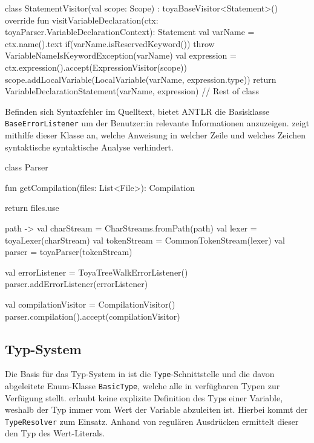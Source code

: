 \begin{KotlinCode}[numbers=none, caption={\visitor-Funktion zum Erstellen eines \texttt{VariableDeclarationStatement}}]
class StatementVisitor(val scope: Scope) : toyaBaseVisitor<Statement>() {
    override fun visitVariableDeclaration(ctx: toyaParser.VariableDeclarationContext): Statement {
        val varName = ctx.name().text
        if(varName.isReservedKeyword()) throw VariableNameIsKeywordException(varName)
        val expression = ctx.expression().accept(ExpressionVisitor(scope))
        scope.addLocalVariable(LocalVariable(varName, expression.type))
        return VariableDeclarationStatement(varName, expression)
    }
    // Rest of class
}
\end{KotlinCode}

Befinden sich Syntaxfehler im Quelltext, bietet ANTLR die Basisklasse \texttt{BaseErrorListener} um der Benutzer:in relevante Informationen anzuzeigen. \Toya zeigt mithilfe dieser Klasse an, welche Anweisung in welcher Zeile und welches Zeichen syntaktische syntaktische Analyse verhindert.

\begin{KotlinCode}[numbers=none, caption={Erstellen des \visitor}]
class Parser {
    fun getCompilation(files: List<File>): Compilation {
        return files.use {path ->
            val charStream = CharStreams.fromPath(path)
            val lexer = toyaLexer(charStream)
            val tokenStream = CommonTokenStream(lexer)
            val parser = toyaParser(tokenStream)

            val errorListener = ToyaTreeWalkErrorListener()
            parser.addErrorListener(errorListener)

            val compilationVisitor = CompilationVisitor()
            parser.compilation().accept(compilationVisitor)
        }
    }
}
\end{KotlinCode}

\subsection{Typ-System}

Die Basis für das Typ-System in \toya ist die \texttt{Type}-Schnittstelle und die davon abgeleitete Enum-Klasse \texttt{BasicType}, welche alle in \toya verfügbaren Typen zur Verfügung stellt. \Toya erlaubt keine explizite Definition des Typs einer Variable, weshalb der Typ immer vom Wert der Variable abzuleiten ist. Hierbei kommt der \texttt{TypeResolver} zum Einsatz. Anhand von regulären Ausdrücken ermittelt dieser den Typ des Wert-Literals.

